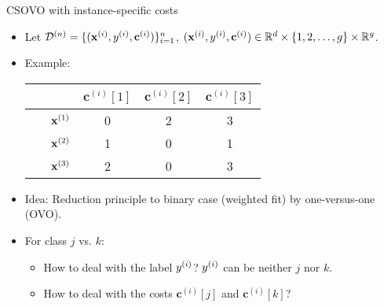 \documentclass[11pt,compress,t,notes=noshow, xcolor=table]{beamer}
\newcommand{\cv}{\mathbf{c}}    %
\begin{document}
\begin{vbframe}{CSOVO with instance-specific costs}
    \footnotesize
    \begin{itemize}
        \footnotesize

        \item Let $\D^{(n)} = \{(\xi, \yi, \cv^{(i)})\}_{i=1}^n$, $(\xi, \yi, \cv^{(i)}) \in \mathbb{R}^d \times \{1, 2, \ldots, g\} \times \mathbb{R}^g$. 
        \vspace{5pt}    
        \item Example:
        \vspace{5pt}

                        \begin{center}
                            \begin{tabular}{cc|ccc}\
        			& & $\cv^{(i)}[1]$ & $\cv^{(i)}[2]$ & $\cv^{(i)}[3]$  \\
        			\hline & $\mathbf{x}^{(1)}$ & 0 & 2 & 3\\
        			& $\mathbf{x}^{(2)}$ & 1 & 0 & 1\\
                 	& $\mathbf{x}^{(3)}$ & 2 & 0 & 3\\
                \end{tabular}
        \end{center}
        
        \vspace{5pt}
        \vspace{5pt}
        
        \item Idea: Reduction principle to binary case (weighted fit) by one-versus-one (OVO). 
        
        \vspace{5pt}
        
        \item For class $j$ vs. $k$:
        \begin{itemize}
            \footnotesize
            \item How to deal with the label $y^{(i)}$? $y^{(i)}$ can be neither $j$ nor $k$.
            \vspace{5pt}
            
            \item How to deal with the costs $\cv^{(i)}[j]$ and $\cv^{(i)}[k]$?
        \end{itemize}
            
    \end{itemize}
\end{vbframe}
\end{document}

